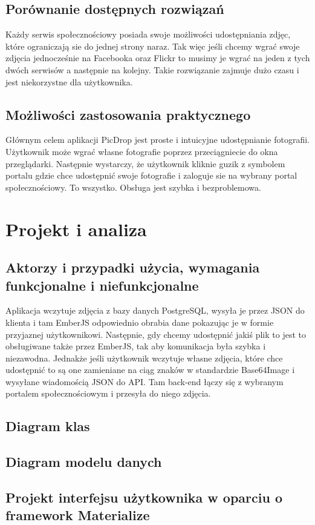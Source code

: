 \documentclass[brudnopis]{xmgr}
\begin{document}
\section{Porównanie dostępnych rozwiązań}
Każdy serwis społecznościowy posiada swoje możliwości udostępniania zdjęc, które ograniczają sie do jednej strony naraz. Tak więc jeśli chcemy wgrać swoje zdjęcia jednocześnie na Facebooka oraz Flickr to musimy je wgrać na jeden z tych dwóch serwisów a następnie na kolejny. Takie rozwiązanie zajmuje dużo czasu i jest niekorzystne dla użytkownika.
\section{Możliwości zastosowania praktycznego}
Głównym celem aplikacji PicDrop jest proste i intuicyjne udostępnianie fotografii. Użytkownik może wgrać własne fotografie poprzez przeciągniecie do okna przeglądarki. Następnie wystarczy, że użytkownik kliknie guzik z symbolem portalu gdzie chce udostępnić swoje fotografie i zaloguje sie na wybrany portal społecznościowy. To wszystko. Obsługa jest szybka i bezproblemowa. 


\chapter{Projekt i analiza}
\section{Aktorzy i przypadki użycia, wymagania funkcjonalne i niefunkcjonalne}
Aplikacja wczytuje zdjęcia z bazy danych PostgreSQL, wysyła je przez JSON do klienta i tam EmberJS odpowiednio obrabia dane pokazując je w formie przyjaznej użytkownikowi. Następnie, gdy chcemy udostępnić jakiś plik to jest to obsługiwane także przez EmberJS, tak aby komunikacja była szybka i niezawodna. Jednakże jeśli użytkownik wczytuje własne zdjęcia, które chce udostępnić to są one zamieniane na ciąg znaków w standardzie Base64Image i wysyłane wiadomością JSON do API. Tam back-end łączy się z wybranym portalem społecznościowym i przesyła do niego zdjęcia. 
\section{Diagram klas}
\section{Diagram modelu danych}
\section{Projekt interfejsu użytkownika w oparciu o framework Materialize}
\end{document}
